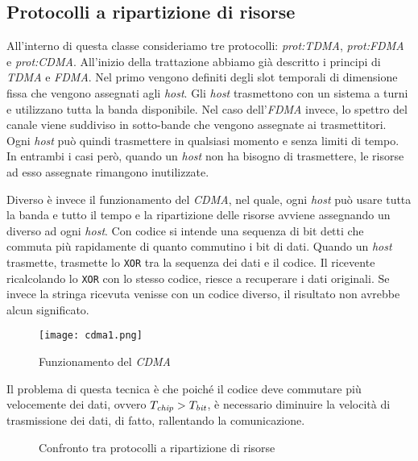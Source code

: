 \subsection{Protocolli a ripartizione di risorse}
All'interno di questa classe consideriamo tre protocolli: \emph{\gls{prot:TDMA}},
\emph{\gls{prot:FDMA}} e \emph{\gls{prot:CDMA}}.
All'inizio della trattazione abbiamo già descritto i principi di \emph{TDMA} e
\emph{FDMA}. Nel primo vengono definiti degli slot temporali di dimensione fissa
che vengono assegnati agli \emph{host}. Gli \emph{host} trasmettono con un
sistema a turni e utilizzano tutta la banda disponibile. Nel caso dell'\emph{FDMA}
invece, lo spettro del canale viene suddiviso in sotto-bande che vengono assegnate
ai trasmettitori. Ogni \emph{host} può quindi trasmettere in qualsiasi momento e
senza limiti di tempo. In entrambi i casi però, quando un \emph{host} non ha
bisogno di trasmettere, le risorse ad esso assegnate rimangono inutilizzate.

Diverso è invece il funzionamento del \emph{CDMA}, nel quale, ogni \emph{host}
può usare tutta la banda e tutto il tempo e la ripartizione delle risorse
avviene assegnando un  diverso ad ogni \emph{host}. Con codice
si intende una sequenza di bit detti  che commuta più rapidamente
di quanto commutino i bit di dati. Quando un \emph{host} trasmette, trasmette lo
\texttt{XOR} tra la sequenza dei dati e il codice. Il ricevente ricalcolando lo
\texttt{XOR} con lo stesso codice, riesce a recuperare i dati originali. Se
invece la stringa ricevuta venisse  con un codice diverso, il
risultato non avrebbe alcun significato.

\begin{figure}[ht]
    \centering
    \texttt{[image: cdma1.png]}
    \caption{Funzionamento del \emph{CDMA}}
\end{figure}

Il problema di questa tecnica è che poiché il codice deve commutare più
velocemente dei dati, ovvero $T_\emph{chip}>T_\emph{bit}$, è necessario
diminuire la velocità di trasmissione dei dati, di fatto, rallentando la
comunicazione.

\begin{figure}[ht!]
    \centering
    \hspace{1mm}
    \hspace{1.5mm}
    \caption{Confronto tra protocolli a ripartizione di risorse}
\end{figure}

